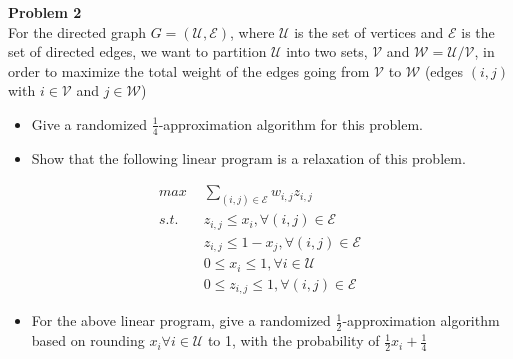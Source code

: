 \documentclass[12pt,letter]{article}
\newcommand{\problem}[1]{\vspace{3mm}\Large\textbf{{Problem {#1}\vspace{3mm}}}\normalsize\\}
\begin{document}
\problem{2}
For the directed graph $G=(\mathcal{U,E})$, where $\mathcal{U}$ is the set of 
vertices and $\mathcal{E}$ is the set of directed edges, we want to partition 
$\mathcal{U}$ into two sets, $\mathcal{V}$ and $\mathcal{W}=\mathcal{U}/
\mathcal{V}$, in order to maximize the total weight of the edges going from 
$\mathcal{V}$ to $\mathcal{W}$ (edges $(i,j)$ with $i\in\mathcal{V}$ and 
$j\in\mathcal{W}$)

\begin{itemize}
    \item Give a randomized $\frac14$-approximation algorithm for this problem.
    \item Show that the following linear program is a relaxation of this problem.
\end{itemize}
\begin{align*}
    max & \sum\limits_{(i,j)\in\mathcal{E}} w_{i,j}z_{i,j}\\
    s.t.\hspace{1em}& z_{i,j} \leq x_i, \forall(i,j)\in \mathcal{E}\\
        & z_{i,j}\leq 1 - x_j, \forall(i,j)\in \mathcal{E}\\
        & 0 \leq x_i \leq 1, \forall i\in \mathcal{U}\\
        & 0 \leq z_{i,j} \leq 1, \forall (i,j)\in\mathcal{E}
\end{align*}
\begin{itemize}
    \item For the above linear program, give a randomized $\frac12$-approximation
          algorithm based on rounding $x_i\forall i\in\mathcal{U}$ to 1, with the
          probability of $\frac12x_i + \frac14$
\end{itemize}
\end{document}
